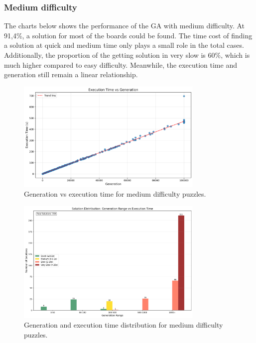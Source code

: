 \subsubsection{Medium difficulty}

The charts below shows the performance of the GA with medium difficulty. At 91,4\%, a solution for most of the boards could be found. The time cost of finding a solution at quick and medium time only plays a small role in the total cases.
Additionally, the proportion of the getting solution in very slow is $60\%$, which is much higher compared to easy difficulty.
Meanwhile, the execution time and generation still remain a linear relationship.

\begin{figure}[H]
\centering
\includegraphics[width=0.8\textwidth]{resources/generation_vs_execution_time_medium.png}
\caption{Generation vs execution time for medium difficulty puzzles.}
\label{fig:generation_vs_execution_time_medium}
\end{figure}

\begin{figure}[H]
\centering
\includegraphics[width=0.8\textwidth]{resources/generation_execution_time_bars_medium.png}
\caption{Generation and execution time distribution for medium difficulty puzzles.}
\label{fig:generation_execution_time_bars_medium}
\end{figure}

